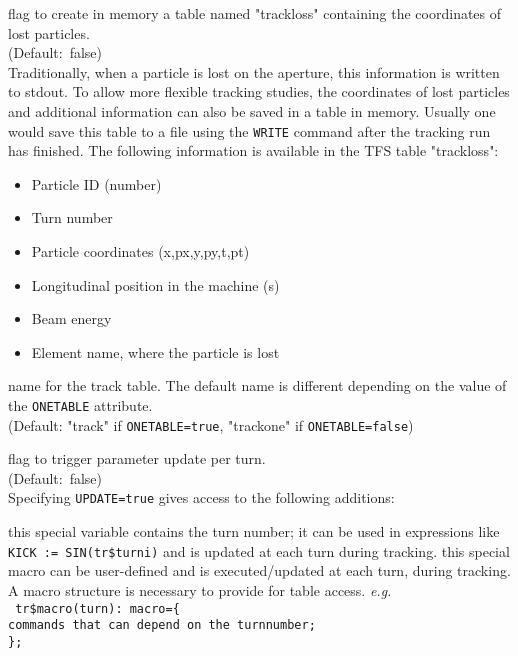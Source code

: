 \begin{madlist}
   flag to create in memory a table named "trackloss"
  containing the coordinates of lost particles.\\
  (Default:~false) \\
  Traditionally, when a particle is lost on the aperture, this information
  is written to stdout. To allow more flexible tracking studies, the
  coordinates of lost particles and additional information can also be
  saved in a table in memory. Usually one would save this table to a
  file using the \texttt{WRITE} command after the tracking run has
  finished. The following information is available in the TFS table
  "trackloss":          
  \begin{itemize}
  \item Particle ID (number)
  \item Turn number
  \item Particle coordinates (x,px,y,py,t,pt)
  \item Longitudinal position in the machine (s)
  \item Beam energy
  \item Element name, where the particle is lost
  \end{itemize}

   name for the track table. The default name is different
  depending on the value of the \texttt{ONETABLE} attribute. \\ 
  (Default: "track" if \texttt{ONETABLE=true}, "trackone" if \texttt{ONETABLE=false})

   flag to trigger parameter update per turn. \\  
  (Default:~false) \\
  Specifying \texttt{UPDATE=true} gives access to the following additions:   
  \begin{madlist}
     this special variable contains the turn number;
    it can be used in expressions like \texttt{KICK := SIN(tr\$turni)} and is
    updated at each turn during tracking.     
      this special macro can be
    user-defined and is executed/updated at each turn, during tracking.
    A macro structure is necessary to provide for table access.
    \textsl{e.g.} \\ 
    \texttt{
      tr\$macro(turn): macro=\{ \\
      commands that can depend on the turnnumber;\\
      \};
    } 
  \end{madlist}

\end{madlist}

